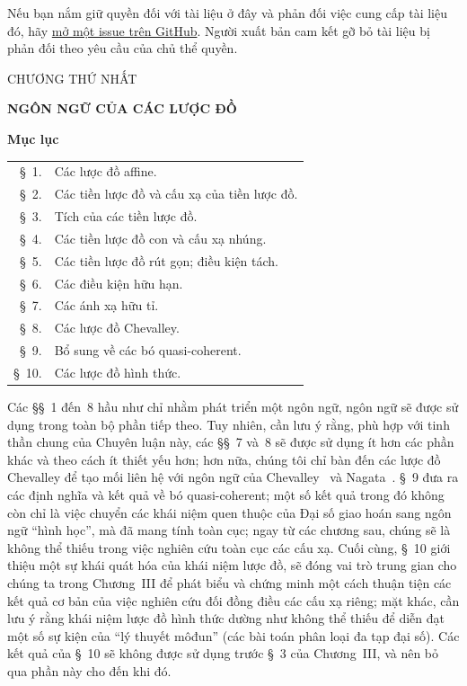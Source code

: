 \documentclass[oneside]{amsart}
\newcommand{\oldpage}[2][]{{\marginnote{\normalfont\textbf{#1}~|~#2}}\ignorespaces}
\let\EGAOriginalLabel\label
\renewcommand{\label}[1]{\phantomsection\EGAOriginalLabel{#1}}
\begin{document}
Nếu bạn nắm giữ quyền đối với tài liệu ở đây và phản đối việc cung cấp tài liệu đó, hãy \href{https://github.com/KokunoYumeto/ega-fga-sga-vi/issues}{mở một issue trên GitHub}. Người xuất bản cam kết gỡ bỏ tài liệu bị phản đối theo yêu cầu của chủ thể quyền.

\par\endgroup\clearpage
\tableofcontents

\clearpage
\oldpage[I]{79}
\label{chapter:I-vi}

\begin{center}
{\large CHƯƠNG THỨ NHẤT\par}
\vspace{1.5em}
{\Large\bfseries NGÔN NGỮ CỦA CÁC LƯỢC ĐỒ\par}
\vspace{1.8em}
{\bfseries Mục lục\par}
\end{center}

\medskip
\begin{tabular}{@{}r@{\ }l@{}}
\S~1.  & Các lược đồ affine.\\
\S~2.  & Các tiền lược đồ và cấu xạ của tiền lược đồ.\\
\S~3.  & Tích của các tiền lược đồ.\\
\S~4.  & Các tiền lược đồ con và cấu xạ nhúng.\\
\S~5.  & Các tiền lược đồ rút gọn; điều kiện tách.\\
\S~6.  & Các điều kiện hữu hạn.\\
\S~7.  & Các ánh xạ hữu tỉ.\\
\S~8.  & Các lược đồ Chevalley.\\
\S~9.  & Bổ sung về các bó quasi-coherent.\\
\S~10. & Các lược đồ hình thức.
\end{tabular}

\medskip
Các \S\S~1 đến~8 hầu như chỉ nhằm phát triển một ngôn ngữ, ngôn ngữ sẽ được
sử dụng trong toàn bộ phần tiếp theo. Tuy nhiên, cần lưu ý rằng, phù hợp với
tinh thần chung của Chuyên luận này, các \S\S~7 và~8 sẽ được sử dụng ít hơn
các phần khác và theo cách ít thiết yếu hơn; hơn nữa, chúng tôi chỉ bàn đến
các lược đồ Chevalley để tạo mối liên hệ với ngôn ngữ của
Chevalley~\cite{I-1} và Nagata~\cite{I-9}. \S~9 đưa ra các định nghĩa và kết
quả về bó quasi-coherent; một số kết quả trong đó không còn chỉ là việc chuyển
các khái niệm quen thuộc của Đại số giao hoán sang ngôn ngữ ``hình học'', mà
đã mang tính toàn cục; ngay từ các chương sau, chúng sẽ là không thể thiếu
trong việc nghiên cứu toàn cục các cấu xạ. Cuối cùng, \S~10 giới thiệu một sự
khái quát hóa của khái niệm lược đồ, sẽ đóng vai trò trung gian cho chúng ta
trong Chương~III để phát biểu và chứng minh một cách thuận tiện các kết quả cơ
bản của việc nghiên cứu đối đồng điều các cấu xạ riêng; mặt khác, cần lưu ý
rằng khái niệm lược đồ hình thức dường như không thể thiếu để diễn đạt một số
sự kiện của ``lý thuyết môđun'' (các bài toán phân loại đa tạp đại số). Các
kết quả của \S~10 sẽ không được sử dụng trước \S~3 của Chương~III, và nên bỏ
qua phần này cho đến khi đó.
\end{document}
